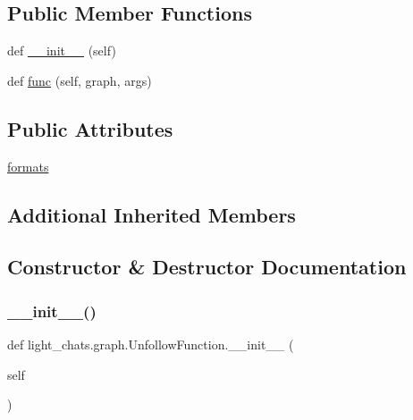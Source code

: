 \subsection*{Public Member Functions}
\begin{DoxyCompactItemize}
\item 
def \hyperlink{classlight__chats_1_1graph_1_1UnfollowFunction_adaf6e40567b940e2b467208eae9507c9}{\+\_\+\+\_\+init\+\_\+\+\_\+} (self)
\item 
def \hyperlink{classlight__chats_1_1graph_1_1UnfollowFunction_a09b37c0a471f8dd65216e434a98983af}{func} (self, graph, args)
\end{DoxyCompactItemize}
\subsection*{Public Attributes}
\begin{DoxyCompactItemize}
\item 
\hyperlink{classlight__chats_1_1graph_1_1UnfollowFunction_a9b7464a052add385de3d685e1627fcf5}{formats}
\end{DoxyCompactItemize}
\subsection*{Additional Inherited Members}


\subsection{Constructor \& Destructor Documentation}
\mbox{\label{classlight__chats_1_1graph_1_1UnfollowFunction_adaf6e40567b940e2b467208eae9507c9}} 
\subsubsection{\texorpdfstring{\+\_\+\+\_\+init\+\_\+\+\_\+()}{\_\_init\_\_()}}
{\footnotesize\ttfamily def light\+\_\+chats.\+graph.\+Unfollow\+Function.\+\_\+\+\_\+init\+\_\+\+\_\+ (\begin{DoxyParamCaption}\item[{}]{self }\end{DoxyParamCaption})}



